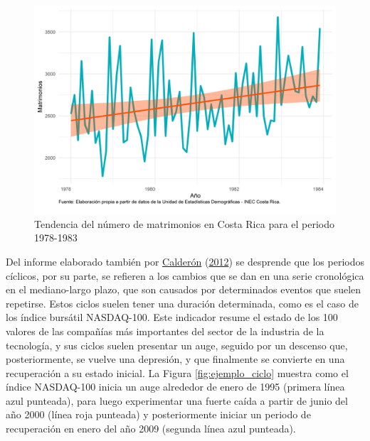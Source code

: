 \documentclass[
]{article}
\begin{document}
\begin{figure}[H]
\includegraphics[width=1\linewidth,height=1\textheight]{Tesis_files/figure-latex/ejemplo_tendencia-1} \caption{Tendencia del número de matrimonios en Costa Rica para el periodo 1978-1983}\label{fig:ejemplo_tendencia}
\end{figure}

Del informe elaborado también por
\protect\hyperlink{ref-calderon2012estadistica}{Calderón}
(\protect\hyperlink{ref-calderon2012estadistica}{2012}) se desprende que
los periodos cíclicos, por su parte, se refieren a los cambios que se
dan en una serie cronológica en el mediano-largo plazo, que son causados
por determinados eventos que suelen repetirse. Estos ciclos suelen tener
una duración determinada, como es el caso de los índice bursátil
NASDAQ-100. Este indicador resume el estado de los 100 valores de las
compañías más importantes del sector de la industria de la tecnología, y
sus ciclos suelen presentar un auge, seguido por un descenso que,
posteriormente, se vuelve una depresión, y que finalmente se convierte
en una recuperación a su estado inicial. La Figura
\ref{fig:ejemplo_ciclo} muestra como el índice NASDAQ-100 inicia un auge
alrededor de enero de 1995 (primera línea azul punteada), para luego
experimentar una fuerte caída a partir de junio del año 2000 (línea roja
punteada) y posteriormente iniciar un periodo de recuperación en enero
del año 2009 (segunda línea azul punteada).
\end{document}
